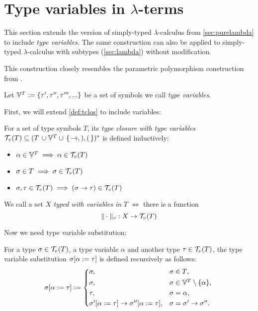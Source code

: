 \documentclass[main.tex]{subfiles}
\begin{document}
\section{Type variables in $\lambda$-terms}
\label{lambda:typevars}

This section extends the version of simply-typed $\lambda$-calculus from
\cref{sec:purelambda} to include \emph{type variables}. The same construction
can also be applied to simply-typed $\lambda$-calculus with subtypes
(\cref{sec:lambda}) without modification.

This construction closely resembles the parametric polymorphism construction
from \cite[chap.~25]{pierce}.

Let $\mathbb{V}^{T} \vcentcolon= \{ \tau', \tau'', \tau''', ... \}$ be a set of symbols we
call \emph{type variables}.

First, we will extend \cref{def:tclos} to include variables:
\begin{defn}
    For a set of type symbols $T$, its \emph{type closure with type variables}
    $\mathcal{T}_v( T ) \subseteq (T \, \cup \mathbb{V}^{T} \cup \,\{\, \rightarrow, ), ( \,\})^*$ is defined
    inductively:

    \begin{itemize}
        \item $\alpha \in \mathbb{V}^{T} \implies \alpha \in \mathcal{T}_v( T )$
        \item $\sigma \in T \implies \sigma \in \mathcal{T}_v( T )$
        \item $\sigma, \tau \in \mathcal{T}_v( T ) \implies (\sigma \rightarrow \tau) \in \mathcal{T}_v( T )$
    \end{itemize}
\end{defn}

\begin{defn}
    We call a set $X$ \emph{typed with variables in} $T$ $\iff$ there is a function
    \[ \|\cdot\|_v : X \rightarrow \mathcal{T}_v( T ) \]
\end{defn}

Now we need type variable substitution:
\begin{defn}
    For a type $\sigma \in \mathcal{T}_v( T )$, a type variable $\alpha$ and another
    type $\tau \in \mathcal{T}_v( T )$, the type variable substitution
    $\sigma [ \alpha := \tau ]$ is defined recursively as follows:
    \[
        \subst{\sigma}{\alpha}{\tau} \defeq
        \begin{cases*}
            \sigma ,& $\sigma \in T$, \\
            \sigma ,& $\sigma \in \tvars \setminus \{ \alpha \}$, \\
            \tau ,& $\sigma = \alpha$, \\
            \subst{\sigma'}{\alpha}{\tau} \tot \subst{\sigma''}{\alpha}{\tau}
 ,& $\sigma = \sigma' \tot \sigma''$. \\
        \end{cases*}
    \]
\end{defn}
\end{document}
